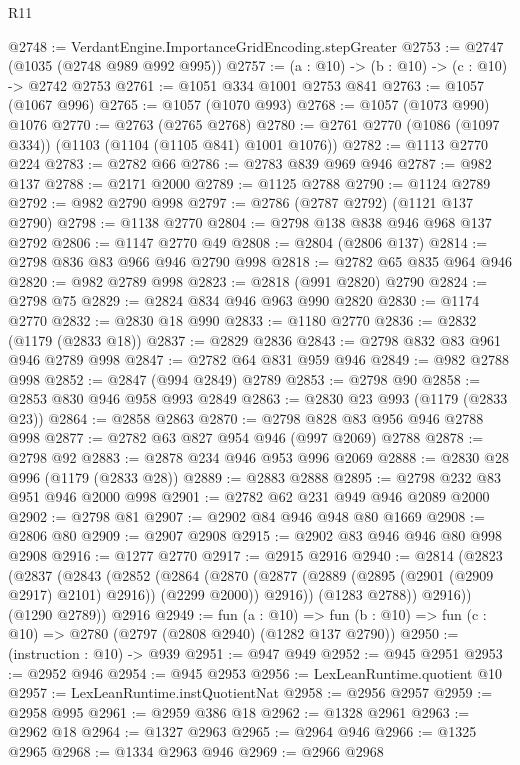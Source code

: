 \begin{lexlean}{R11}
\begin{coremodule}
@2748 := VerdantEngine.ImportanceGridEncoding.stepGreater
@2753 := @2747 (@1035 (@2748 @989 @992 @995))
@2757 := (a : @10) -> (b : @10) -> (c : @10) -> @2742 @2753
@2761 := @1051 @334 @1001 @2753 @841
@2763 := @1057 (@1067 @996)
@2765 := @1057 (@1070 @993)
@2768 := @1057 (@1073 @990) @1076
@2770 := @2763 (@2765 @2768)
@2780 := @2761 @2770 (@1086 (@1097 @334)) (@1103 (@1104 (@1105 @841) @1001 @1076))
@2782 := @1113 @2770 @224
@2783 := @2782 @66
@2786 := @2783 @839 @969 @946
@2787 := @982 @137
@2788 := @2171 @2000
@2789 := @1125 @2788
@2790 := @1124 @2789
@2792 := @982 @2790 @998
@2797 := @2786 (@2787 @2792) (@1121 @137 @2790)
@2798 := @1138 @2770
@2804 := @2798 @138 @838 @946 @968 @137 @2792
@2806 := @1147 @2770 @49
@2808 := @2804 (@2806 @137)
@2814 := @2798 @836 @83 @966 @946 @2790 @998
@2818 := @2782 @65 @835 @964 @946
@2820 := @982 @2789 @998
@2823 := @2818 (@991 @2820) @2790
@2824 := @2798 @75
@2829 := @2824 @834 @946 @963 @990 @2820
@2830 := @1174 @2770
@2832 := @2830 @18 @990
@2833 := @1180 @2770
@2836 := @2832 (@1179 (@2833 @18))
@2837 := @2829 @2836
@2843 := @2798 @832 @83 @961 @946 @2789 @998
@2847 := @2782 @64 @831 @959 @946
@2849 := @982 @2788 @998
@2852 := @2847 (@994 @2849) @2789
@2853 := @2798 @90
@2858 := @2853 @830 @946 @958 @993 @2849
@2863 := @2830 @23 @993 (@1179 (@2833 @23))
@2864 := @2858 @2863
@2870 := @2798 @828 @83 @956 @946 @2788 @998
@2877 := @2782 @63 @827 @954 @946 (@997 @2069) @2788
@2878 := @2798 @92
@2883 := @2878 @234 @946 @953 @996 @2069
@2888 := @2830 @28 @996 (@1179 (@2833 @28))
@2889 := @2883 @2888
@2895 := @2798 @232 @83 @951 @946 @2000 @998
@2901 := @2782 @62 @231 @949 @946 @2089 @2000
@2902 := @2798 @81
@2907 := @2902 @84 @946 @948 @80 @1669
@2908 := @2806 @80
@2909 := @2907 @2908
@2915 := @2902 @83 @946 @946 @80 @998 @2908
@2916 := @1277 @2770
@2917 := @2915 @2916
@2940 := @2814
    (@2823
      (@2837
        (@2843
          (@2852
            (@2864
              (@2870 (@2877 (@2889 (@2895 (@2901 (@2909 @2917) @2101) @2916)) (@2299 @2000)) @2916))
            (@1283 @2788))
          @2916))
      (@1290 @2789))
    @2916
@2949 := fun (a : @10) =>
  fun (b : @10) => fun (c : @10) => @2780 (@2797 (@2808 @2940) (@1282 @137 @2790))
@2950 := (instruction : @10) -> @939
@2951 := @947 @949
@2952 := @945 @2951
@2953 := @2952 @946
@2954 := @945 @2953
@2956 := LexLeanRuntime.quotient @10
@2957 := LexLeanRuntime.instQuotientNat
@2958 := @2956 @2957
@2959 := @2958 @995
@2961 := @2959 @386 @18
@2962 := @1328 @2961
@2963 := @2962 @18
@2964 := @1327 @2963
@2965 := @2964 @946
@2966 := @1325 @2965
@2968 := @1334 @2963 @946
@2969 := @2966 @2968

\end{coremodule}
\end{lexlean}
